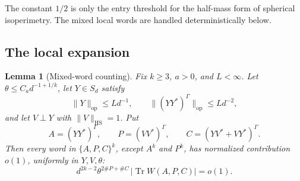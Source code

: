 \documentclass[11pt]{article}
\newtheorem{lemma}[theorem]{Lemma}
\DeclareMathOperator{\Tr}{Tr}
\newcommand{\HS}{\mathrm{HS}}
\newcommand{\op}{\mathrm{op}}
\begin{document}
The constant \(1/2\) is only the entry threshold for the half-mass form of
spherical isoperimetry.  The mixed local words are handled deterministically
below.

\subsection{The local expansion}

\begin{lemma}[Mixed-word counting]\label{lem:mixed-word-counting}
Fix \(k\ge3\), \(a>0\), and \(L<\infty\).  Let
\(\theta\le C_a d^{-1+1/k}\), let \(Y\in S_d\) satisfy
\[
  \|Y\|_{\op}\le Ld^{-1},
  \qquad
  \|(YY^*)^\Gamma\|_{\op}\le Ld^{-2},
\]
and let \(V\perp Y\) with \(\|V\|_{\HS}=1\).  Put
\[
  A=(YY^*)^\Gamma,\qquad
  P=(VV^*)^\Gamma,\qquad
  C=(YV^*+VY^*)^\Gamma .
\]
Then every word in \(\{A,P,C\}^k\), except \(A^k\) and \(P^k\), has normalized
contribution \(o(1)\), uniformly in \(Y,V,\theta\):
\[
  d^{2k-2}\theta^{2\#P+\#C}\,|\Tr W(A,P,C)|=o(1).
\]
\end{lemma}
\end{document}
